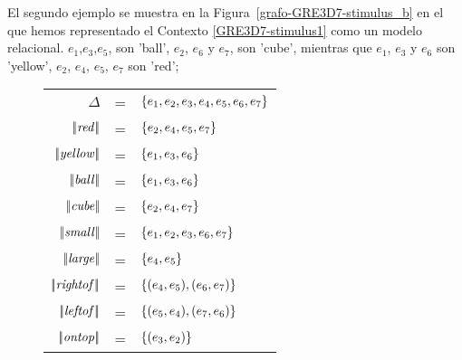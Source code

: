 




El segundo ejemplo se muestra en la Figura~\ref{grafo-GRE3D7-stimulus_b} en el que hemos representado el Contexto \ref{GRE3D7-stimulus1} 
como un modelo relacional. $e_1$,$e_3$,$e_5$, son 'ball', $e_2$, $e_6$ y $e_7$, son 'cube', mientras que 
$e_1$, $e_3$ y $e_6$ son 'yellow', $e_2$, $e_4$, $e_5$, $e_7$ son 'red';\\


\begin{figure}
\begin{flushleft}
\begin{tabular}{rcl}
$\Delta$              & = & $\{e_1,e_2,e_3,e_4,e_5,e_6,e_7\}$\\
$|\!|\mathit{red}|\!|$      & = & $\{e_2,e_4,e_5,e_7\}$\\
$|\!|\mathit{yellow}|\!|$   & = & $\{e_1,e_3,e_6\}$\\
$|\!|\mathit{ball}|\!|$     & = & $\{e_1,e_3,e_6\}$\\
$|\!|\mathit{cube}|\!|$     & = & $\{e_2,e_4,e_7\}$\\

$|\!|\mathit{small}|\!|$    & = & $\{e_1,e_2,e_3,e_6,e_7\}$\\
$|\!|\mathit{large}|\!|$    & = & $\{e_4,e_5\}$\\

$|\!|\mathit{rightof}|\!|$   & = & $\{(e_4,e_5),(e_6,e_7)\}$\\
$|\!|\mathit{leftof}|\!|$    & = & $\{(e_5,e_4),(e_7,e_6)\}$\\
$|\!|\mathit{ontop}|\!|$     & = & $\{(e_3,e_2)\}$\\


\end{tabular}
\end{flushleft}
\end{figure}

